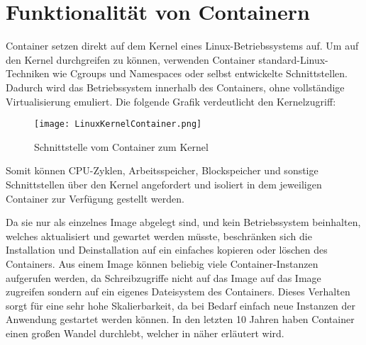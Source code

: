 \section{Funktionalität von Containern}
\label{sec:Funktionalität von Container}

Container setzen direkt auf dem Kernel eines Linux-Betriebssystems auf. Um auf den Kernel durchgreifen zu können, verwenden Container standard-Linux-Techniken wie Cgroups und Namespaces oder selbst entwickelte Schnittstellen. Dadurch wird das Betriebssystem innerhalb des Containers, ohne vollständige Virtualisierung emuliert. Die folgende Grafik verdeutlicht den Kernelzugriff:
\begin{figure}[H]
	\begin{center}
		\texttt{[image: LinuxKernelContainer.png]}
	\end{center}
	\caption[Schnittstelle vom Container zum Kernel]{Schnittstelle vom Container zum Kernel \footnotemark}
	\label{fig:HW1}
\end{figure}
Somit können CPU-Zyklen, Arbeitsspeicher, Blockspeicher und sonstige Schnittstellen über den Kernel angefordert und isoliert in dem jeweiligen Container zur Verfügung gestellt werden.\cite{DataCenter}

Da sie nur als einzelnes Image abgelegt sind, und kein Betriebssystem beinhalten, welches aktualisiert und gewartet werden müsste, beschränken sich die Installation und Deinstallation auf ein einfaches kopieren oder löschen des Containers. 
Aus einem Image können beliebig viele Container-Instanzen aufgerufen werden, da Schreibzugriffe nicht auf das Image auf das Image zugreifen sondern auf ein eigenes Dateisystem des Containers. Dieses Verhalten sorgt für eine sehr hohe Skalierbarkeit, da bei Bedarf einfach neue Instanzen der Anwendung gestartet werden können.\cite{DevInsider}
In den letzten 10 Jahren haben Container einen großen Wandel durchlebt, welcher in  näher erläutert wird.
\newpage